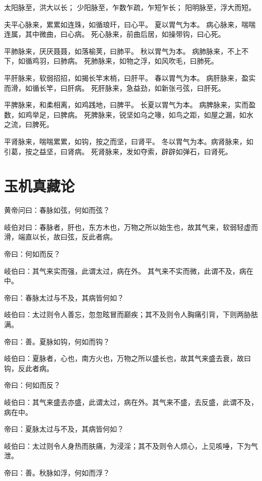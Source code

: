\documentclass{article}%
\begin{document}
太阳脉至，洪大以长；
少阳脉至，乍数乍疏，乍短乍长；
阳明脉至，浮大而短。

夫平心脉来，累累如连珠，如循琅玕，曰心平。
夏以胃气为本。
病心脉来，喘喘连属，其中微曲，曰心病。
死心脉来，前曲后居，如操带钩，曰心死。

平肺脉来，厌厌聂聂，如落榆荚，曰肺平。
秋以胃气为本。
病肺脉来，不上不下，如循鸡羽，曰肺病。
死肺脉来，如物之浮，如风吹毛，曰肺死。

平肝脉来，软弱招招，如揭长竿末梢，曰肝平。
春以胃气为本。
病肝脉来，盈实而滑，如循长竿，曰肝病。
死肝脉来，急益劲，如新张弓弦，曰肝死。

平脾脉来，和柔相离，如鸡践地，曰脾平。
长夏以胃气为本。
病脾脉来，实而盈数，如鸡举足，曰脾病。
死脾脉来，锐坚如乌之喙，如鸟之距，如屋之漏，如水之流，曰脾死。

平肾脉来，喘喘累累，如钩，按之而坚，曰肾平。
冬以胃气为本。病肾脉来，如引葛，按之益坚，曰肾病。
死肾脉来，发如夺索，辟辟如弹石，曰肾死。


\section{玉机真藏论}

黄帝问曰：春脉如弦，何如而弦？

岐伯对曰：春脉者，肝也，东方木也，万物之所以始生也，故其气来，软弱轻虚而滑，端直以长，故曰弦，反此者病。

帝曰：何如而反？

岐伯曰：其气来实而强，此谓太过，病在外。
其气来不实而微，此谓不及，病在中。

帝曰：春脉太过与不及，其病皆何如？

岐伯曰：太过则令人善忘，忽忽眩冒而巅疾；其不及则令人胸痛引背，下则两胁胠满。

帝曰：善。夏脉如钩，何如而钩？

岐伯曰：夏脉者，心也，南方火也，万物之所以盛长也，故其气来盛去衰，故曰钩，反此者病。

帝曰：何如而反？

岐伯曰：其气来盛去亦盛，此谓太过，病在外。其气来不盛，去反盛，此谓不及，病在中。

帝曰：夏脉太过与不及，其病皆何如？

岐伯曰：太过则令人身热而肤痛，为浸淫；其不及则令人烦心，上见咳唾，下为气泄。

帝曰：善。秋脉如浮，何如而浮？
\end{document}
